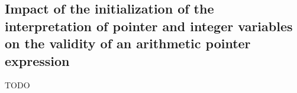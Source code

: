 %
%
%
%
%
%
%
%

\subsection{Impact of the initialization of the interpretation of pointer and integer variables on the validity of an arithmetic pointer expression}

TODO

